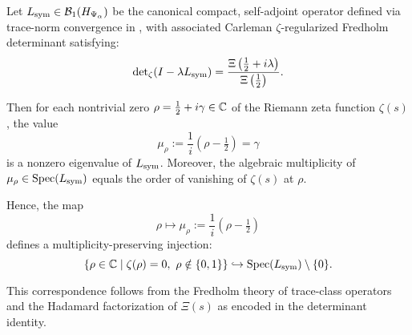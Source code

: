 \begin{lemma}
\label{lem:zero_to_eigenvalue_injection}
Let \( L_{\mathrm{sym}} \in \mathcal{B}_1(H_{\Psi_\alpha}) \) be the canonical compact, self-adjoint operator defined via trace-norm convergence in , with associated Carleman \(\zeta\)-regularized Fredholm determinant satisfying:
\[
\det\nolimits_{\zeta}(I - \lambda L_{\mathrm{sym}}) = \frac{\Xi\left(\tfrac{1}{2} + i\lambda\right)}{\Xi\left(\tfrac{1}{2}\right)}.
\]

Then for each nontrivial zero \( \rho = \tfrac{1}{2} + i\gamma \in \mathbb{C} \) of the Riemann zeta function \( \zeta(s) \), the value
\[
\mu_\rho := \frac{1}{i}(\rho - \tfrac{1}{2}) = \gamma
\]
is a nonzero eigenvalue of \( L_{\mathrm{sym}} \). Moreover, the algebraic multiplicity of \( \mu_\rho \in \operatorname{Spec}(L_{\mathrm{sym}}) \) equals the order of vanishing of \( \zeta(s) \) at \( \rho \).

\medskip

\noindent
Hence, the map
\[
\rho \longmapsto \mu_\rho := \frac{1}{i}(\rho - \tfrac{1}{2})
\]
defines a multiplicity-preserving injection:
\[
\left\{ \rho \in \mathbb{C} \;\middle|\; \zeta(\rho) = 0,\ \rho \notin \{0,1\} \right\}
\hookrightarrow
\operatorname{Spec}(L_{\mathrm{sym}}) \setminus \{0\}.
\]

\noindent
This correspondence follows from the Fredholm theory of trace-class operators and the Hadamard factorization of \( \Xi(s) \) as encoded in the determinant identity.
\end{lemma}
